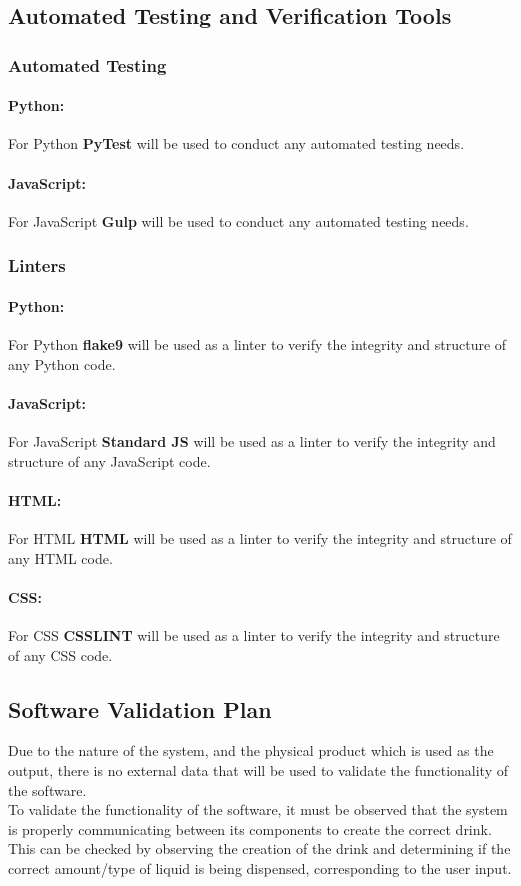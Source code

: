 \documentclass[12pt, titlepage]{article}
\begin{document}
\subsection{Automated Testing and Verification Tools}
\subsubsection{Automated Testing}
\paragraph{Python:}
For Python \textbf{PyTest} will be used to conduct any automated testing needs.
\paragraph{JavaScript:} 
For JavaScript \textbf{Gulp} will be used to conduct any automated testing needs.

\subsubsection{Linters}
\paragraph{Python:}
For Python \textbf{flake9} will be used as a linter to verify the integrity and structure of any Python code.

\paragraph{JavaScript:} 
For JavaScript \textbf{Standard JS} will be used as a linter to verify the integrity and structure of any JavaScript code.

\paragraph{HTML:}
For HTML \textbf{HTML} will be used as a linter to verify the integrity and structure of any HTML code.

\paragraph{CSS:} 
For CSS \textbf{CSSLINT} will be used as a linter to verify the integrity and structure of any CSS code.


\subsection{Software Validation Plan}
Due to the nature of the system, and the physical product which is used as the output, there is no external data that will be used to validate the functionality of the software. \\
\indent To validate the functionality of the software, it must be observed that the system is properly communicating between its components to create the correct drink. This can be checked by observing the creation of the drink and determining if the correct amount/type of liquid is being dispensed, corresponding to the user input.
\end{document}
